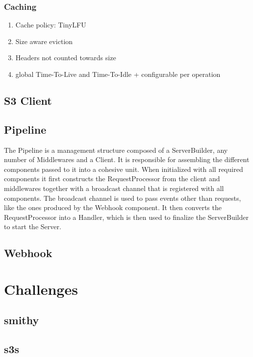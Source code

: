 \subsubsection{Caching}
\begin{enumerate}
	\item Cache policy: TinyLFU
	\item Size aware eviction
	\item Headers not counted towards size
	\item global Time-To-Live and Time-To-Idle + configurable per operation
\end{enumerate}

\subsection{S3 Client}

\subsection{Pipeline}

The Pipeline is a management structure composed of a ServerBuilder, any number of Middlewares and a Client. It is responsible for assembling the different components passed to it into a cohesive unit. When initialized with all required components it first constructs the RequestProcessor from the client and middlewares together with a broadcast channel that is registered with all components. The broadcast channel is used to pass events other than requests, like the ones produced by the Webhook component. It then converts the RequestProcessor into a Handler, which is then used to finalize the ServerBuilder to start the Server.

\subsection{Webhook}

\section{Challenges}

\subsection{smithy}
\subsection{s3s}